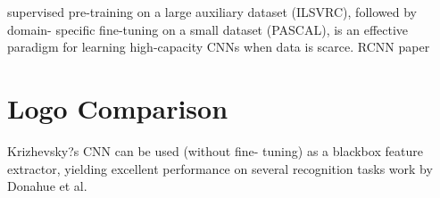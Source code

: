 supervised pre-training on a large auxiliary dataset (ILSVRC), followed by domain- specific fine-tuning on a small dataset (PASCAL), is an effective paradigm for learning high-capacity CNNs when data is scarce. RCNN paper \cite{DBLP:journals/corr/GirshickDDM13}

\section{Logo Comparison}

Krizhevsky?s CNN can be used (without fine- tuning) as a blackbox feature extractor, yielding excellent performance on several recognition tasks work by Donahue et al. \cite{DBLP:journals/corr/DonahueJVHZTD13}

